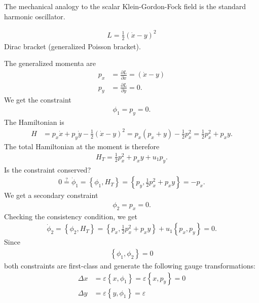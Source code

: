 \begin{solution}
The mechanical analogy to the scalar Klein-Gordon-Fock field is the standard harmonic oscillator.
\end{solution}


\begin{exercise}
\begin{align*}
L = \frac{1}{2} (\dot{x} - y)^2
\end{align*}
Dirac bracket (generalized Poisson bracket).
\end{exercise}
\begin{solution}
The generalized momenta are
\begin{align*}
p_x &= \frac{\partial L}{\partial \dot{x}} = (\dot{x} - y) \\
p_y &= \frac{\partial L}{\partial \dot{y}} = 0.
\end{align*}
We get the constraint 
\begin{align*}
\phi_1 = p_y = 0.
\end{align*}
The Hamiltonian is
\begin{align*}
H &= p_x \dot{x} + p_y \dot{y} - \frac{1}{2} (\dot{x} - y)^2 = p_x (p_x + y) - \frac{1}{2} p_x^2 = \frac{1}{2} p_x^2 + p_x y.
\end{align*}
The total Hamiltonian at the moment is therefore
\begin{align*}
H_T = \frac{1}{2} p_x^2 + p_x y + u_1 p_y.
\end{align*}
Is the constraint conserved?
\begin{align*}
0 \overset{?}{=} \dot{\phi}_1 = \left \{ \phi_1,H_T \right \} = \left \{ p_y,\frac{1}{2} p_x^2 + p_x y \right \} = - p_x.
\end{align*}
We get a secondary constraint 
\begin{align*}
\phi_2 = p_x = 0.
\end{align*}
Checking the consistency condition, we get
\begin{align*}
\dot{\phi}_2 = \left \{ \phi_2,H_T \right \} = \left \{ p_x,\frac{1}{2} p_x^2 + p_x y \right \} + u_1 \left \{ p_x,p_y \right \} = 0.
\end{align*}
Since 
\begin{align*}
\left \{ \phi_1,\phi_2 \right \} = 0
\end{align*}
both constraints are first-class and generate the following gauge transformations:
\begin{align*}
\Delta x &= \varepsilon \left \{ x,\phi_1 \right \} = \varepsilon \left \{ x,p_y \right \} = 0 \\
\Delta y &= \varepsilon \left \{ y,\phi_1 \right \} = \varepsilon \\

\end{align*}
\end{solution}
